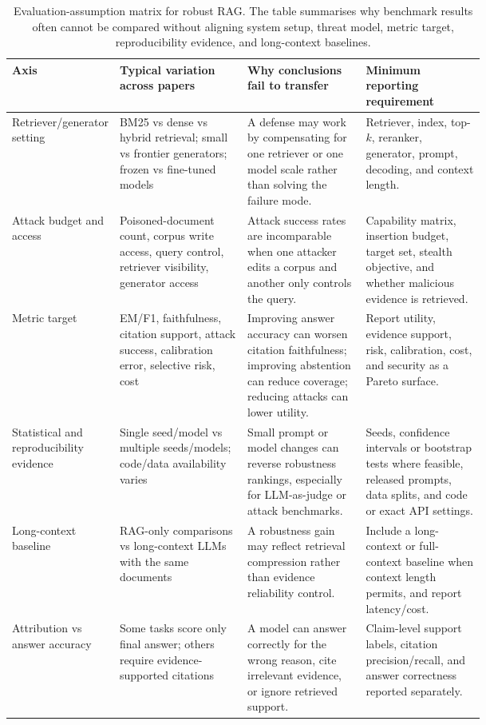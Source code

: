 \begin{table}[t]
\centering
\scriptsize
\renewcommand{\arraystretch}{0.92}
\begin{tabularx}{\linewidth}{>{\raggedright\arraybackslash}p{0.17\linewidth}>{\raggedright\arraybackslash}p{0.27\linewidth}>{\raggedright\arraybackslash}p{0.25\linewidth}X}
\toprule
\textbf{Axis} & \textbf{Typical variation across papers} & \textbf{Why conclusions fail to transfer} & \textbf{Minimum reporting requirement} \\
\midrule
Retriever/generator setting & BM25 vs dense vs hybrid retrieval; small vs frontier generators; frozen vs fine-tuned models & A defense may work by compensating for one retriever or one model scale rather than solving the failure mode. & Retriever, index, top-$k$, reranker, generator, prompt, decoding, and context length. \\
Attack budget and access & Poisoned-document count, corpus write access, query control, retriever visibility, generator access & Attack success rates are incomparable when one attacker edits a corpus and another only controls the query. & Capability matrix, insertion budget, target set, stealth objective, and whether malicious evidence is retrieved. \\
Metric target & EM/F1, faithfulness, citation support, attack success, calibration error, selective risk, cost & Improving answer accuracy can worsen citation faithfulness; improving abstention can reduce coverage; reducing attacks can lower utility. & Report utility, evidence support, risk, calibration, cost, and security as a Pareto surface. \\
Statistical and reproducibility evidence & Single seed/model vs multiple seeds/models; code/data availability varies & Small prompt or model changes can reverse robustness rankings, especially for LLM-as-judge or attack benchmarks. & Seeds, confidence intervals or bootstrap tests where feasible, released prompts, data splits, and code or exact API settings. \\
Long-context baseline & RAG-only comparisons vs long-context LLMs with the same documents & A robustness gain may reflect retrieval compression rather than evidence reliability control. & Include a long-context or full-context baseline when context length permits, and report latency/cost. \\
Attribution vs answer accuracy & Some tasks score only final answer; others require evidence-supported citations & A model can answer correctly for the wrong reason, cite irrelevant evidence, or ignore retrieved support. & Claim-level support labels, citation precision/recall, and answer correctness reported separately. \\
\bottomrule
\end{tabularx}
\caption{Evaluation-assumption matrix for robust RAG. The table summarises why benchmark results often cannot be compared without aligning system setup, threat model, metric target, reproducibility evidence, and long-context baselines.}
\label{tab:evaluation-assumption-matrix}
\end{table}

